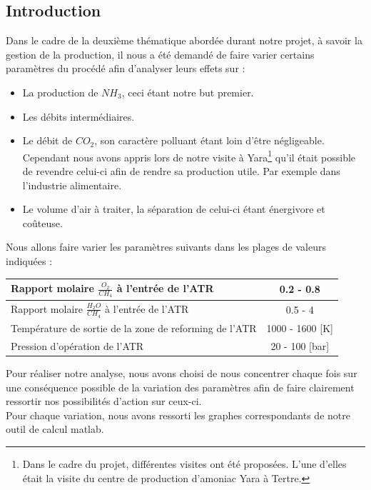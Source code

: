 \documentclass[12pt]{report}
\begin{document}
\renewcommand{\arraystretch}{1.5}

\begin{titlepage}


\end{titlepage}


\tableofcontents

{\textcolor{carmine}{\chapter{Introduction}}}

Dans le cadre de la deuxième thématique abordée durant notre projet, à savoir la gestion de la production, il nous a été demandé de faire varier certains paramètres du procédé afin d'analyser leurs effets sur : \\
\begin{itemize}
\item La production de $NH_3$, ceci étant notre but premier.
\item Les débits intermédiaires.
\item Le débit de $CO_2$, son caractère polluant étant loin d'être négligeable. Cependant nous avons appris lors de notre visite à Yara\footnote{Dans le cadre du projet, différentes visites ont été proposées. L'une d'elles était la visite du centre de production d'amoniac Yara à Tertre.} qu'il était possible de revendre celui-ci afin de rendre sa production utile. Par exemple dans l'industrie alimentaire. 
\item Le volume d'air à traiter, la séparation de celui-ci étant énergivore et coûteuse.
\end{itemize}

Nous allons faire varier les paramètres suivants dans les plages de valeurs indiquées : \\


\begin{tabular}{|l|c|}
\hline
Rapport molaire $\frac{O_2}{CH_4}$ à l'entrée de l'ATR & 0.2 - 0.8 \\
\hline
Rapport molaire $\frac{H_2O}{CH_4}$ à l'entrée de l'ATR & 0.5 - 4 \\
\hline
Température de sortie de la zone de reforming de l'ATR & 1000 - 1600 [K]\\
\hline
Pression d'opération de l'ATR & 20 - 100 [bar] \\
\hline
\end{tabular}
\bigskip

Pour réaliser notre analyse, nous avons choisi de nous concentrer chaque fois sur une conséquence possible de la variation des paramètres afin de faire clairement ressortir nos possibilités d'action sur ceux-ci.\\
Pour chaque variation, nous avons ressorti les graphes correspondants de notre outil de calcul matlab.\\
\end{document}
